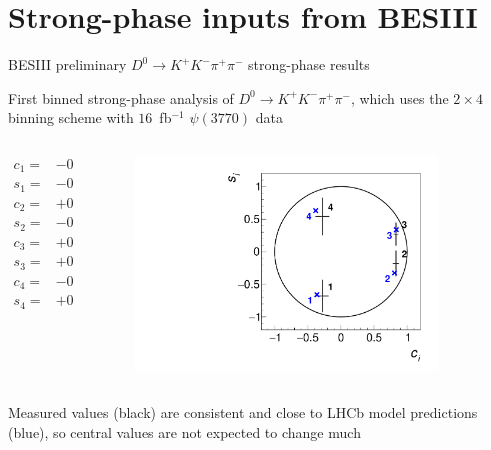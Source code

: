 \documentclass[xcolor={dvipsnames}]{beamer}
\begin{document}
\section{Strong-phase inputs from BESIII}
\begin{frame}{BESIII preliminary $D^0\to K^+K^-\pi^+\pi^-$ strong-phase results}
  \begin{center}
    First binned strong-phase analysis of $D^0\to K^+K^-\pi^+\pi^-$, which uses the $2\times4$ binning scheme with $16$~fb$^{-1}$ $\psi(3770)$ data
  \end{center}
  \vspace{-0.3cm}
  \begin{columns}
    \begin{column}{0.5\textwidth}
      \vspace{-0.5cm}
      \begin{align*}
        c_1 =& -0.28 \pm 0.09 \pm 0.01 \\
        s_1 =& -0.68 \pm 0.24 \pm 0.04 \\
        c_2 =& +0.83 \pm 0.04 \pm 0.01 \\
        s_2 =& -0.18 \pm 0.19 \pm 0.03 \\
        c_3 =& +0.83 \pm 0.03 \pm 0.01 \\
        s_3 =& +0.27 \pm 0.17 \pm 0.03 \\
        c_4 =& -0.28 \pm 0.10 \pm 0.01 \\
        s_4 =& +0.54 \pm 0.28 \pm 0.04
      \end{align*}
    \end{column}
    \begin{column}{0.5\textwidth}
      \begin{figure}
        \centering
        \includegraphics[width=0.9\textwidth]{Plots/cisi_FitResults_Model.pdf}
      \end{figure}
    \end{column}
  \end{columns}
  \begin{center}
    Measured values (black) are consistent and close to LHCb model predictions (blue), so central values are not expected to change much
  \end{center}
\end{frame}
\end{document}
